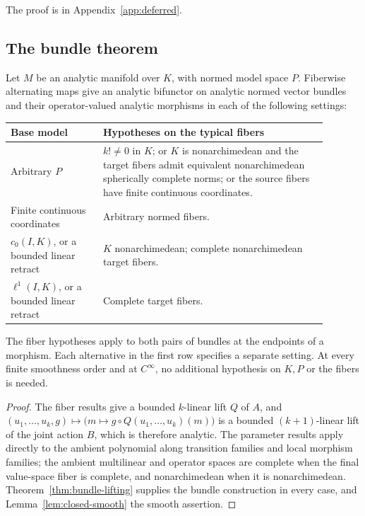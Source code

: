 The proof is in Appendix~\ref{app:deferred}.

\subsection{The bundle theorem}\label{spl:ssec:bundle}

\begin{corollary}\label{cor:bundle-cases}
Let $M$ be an analytic manifold over $K$, with normed model space $P$. Fiberwise alternating maps give an analytic bifunctor on analytic normed vector bundles and their operator-valued analytic morphisms in each of the following settings:
\begin{center}
\begin{tabular}{p{0.26\linewidth}p{0.63\linewidth}}
\hline
Base model & Hypotheses on the typical fibers\\
\hline
Arbitrary $P$ & $k!\ne0$ in $K$; or $K$ is nonarchimedean and the target fibers admit equivalent nonarchimedean spherically complete norms; or the source fibers have finite continuous coordinates.\\[3pt]
Finite continuous coordinates & Arbitrary normed fibers.\\[3pt]
$c_0(I,K)$, or a bounded linear retract & $K$ nonarchimedean; complete nonarchimedean target fibers.\\[3pt]
$\ell^1(I,K)$, or a bounded linear retract & Complete target fibers.\\
\hline
\end{tabular}
\end{center}
The fiber hypotheses apply to both pairs of bundles at the endpoints of a morphism. Each alternative in the first row specifies a separate setting. At every finite smoothness order and at $C^\infty$, no additional hypothesis on $K,P$ or the fibers is needed.
\end{corollary}
\begin{proof}
The fiber results give a bounded $k$-linear lift $Q$ of $A$, and
$(u_1,\ldots,u_k,g)\mapsto\bigl(m\mapsto g\circ Q(u_1,\ldots,u_k)(m)\bigr)$ is a bounded $(k+1)$-linear lift of the joint
action $B$, which is therefore analytic. The parameter results apply directly to the ambient polynomial along transition
families and local morphism families; the ambient multilinear and operator spaces are complete when the final
value-space fiber is complete, and nonarchimedean when it is nonarchimedean. Theorem~\ref{thm:bundle-lifting} supplies the
bundle construction in every case, and Lemma~\ref{lem:closed-smooth} the smooth assertion.
\end{proof}

